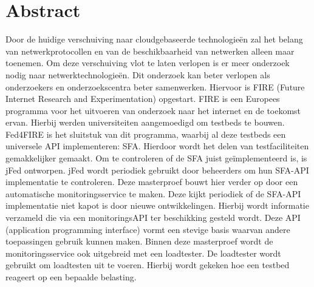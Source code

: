 \newpage
\chapter*{Abstract}
\npar
Door de huidige verschuiving naar cloudgebaseerde technologie\"en zal het belang 
van netwerkprotocollen en van de beschikbaarheid van netwerken alleen maar toenemen.
Om deze verschuiving vlot te laten verlopen is er meer onderzoek nodig naar netwerktechnologie\"en. Dit onderzoek kan beter verlopen als onderzoekers en onderzoekscentra beter samenwerken. Hiervoor is FIRE (Future Internet Research and Experimentation) opgestart. FIRE is een Europees programma voor het uitvoeren van onderzoek naar het internet en de toekomst ervan. Hierbij werden universiteiten aangemoedigd om testbeds te bouwen.
\npar
Fed4FIRE is het sluitstuk van dit programma, waarbij al deze testbeds een universele API implementeren: SFA. Hierdoor wordt het delen van testfaciliteiten gemakkelijker gemaakt. Om te controleren of de SFA juist ge\"implementeerd is, is jFed ontworpen. 
jFed wordt periodiek gebruikt door beheerders om hun SFA-API implementatie te controleren.
\npar 
Deze masterproef bouwt hier verder op door een automatische monitoringsservice te maken. Deze kijkt periodiek of de SFA-API implementatie niet kapot is door nieuwe ontwikkelingen. Hierbij wordt informatie verzameld die via een monitoringsAPI ter beschikking gesteld wordt. Deze API (application programming interface) vormt een stevige basis waarvan andere toepassingen gebruik kunnen maken.
\npar
Binnen deze masterproef wordt de monitoringsservice ook uitgebreid met een loadtester. De loadtester wordt gebruikt om loadtesten uit te voeren. Hierbij wordt gekeken hoe een testbed reageert op een bepaalde belasting.